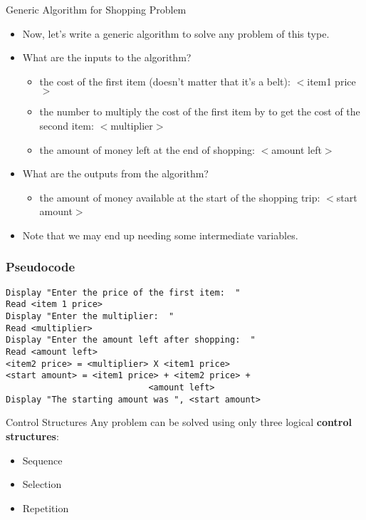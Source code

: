 \documentclass[graphics]{beamer}
\begin{document}
\begin{frame}{Generic Algorithm for Shopping Problem}
    \begin{itemize}
        \item Now, let’s write a generic algorithm to solve any problem of this type.
        \item What are the inputs to the algorithm?
        \begin{itemize}
            \item the cost of the first item (doesn’t matter that it’s a belt):  $<$item1 price$>$
            \item the number to multiply the cost of the first item by to get the cost of the second item:  $<$multiplier$>$
            \item the amount of money left at the end of shopping: $<$amount left$>$
        \end{itemize}
        \pause
        \item What are the outputs from the algorithm?
        \begin{itemize}
            \item the amount of money available at the start of the shopping trip: $<$start amount$>$
        \end{itemize}
        \item Note that we may end up needing some intermediate variables.
    \end{itemize}
\end{frame}

\begin{frame}[fragile]\frametitle{Pseudocode}
    \begin{verbatim}
Display "Enter the price of the first item:  "
Read <item 1 price>
Display "Enter the multiplier:  "
Read <multiplier>
Display "Enter the amount left after shopping:  "
Read <amount left>
<item2 price> = <multiplier> X <item1 price>
<start amount> = <item1 price> + <item2 price> +
                            <amount left>
Display "The starting amount was ", <start amount> 
    \end{verbatim}
\end{frame}

\begin{frame}{Control Structures}
    Any problem can be solved using only three logical \textbf{control structures}:
    \begin{itemize}
        \item Sequence
        \item Selection
        \item Repetition
    \end{itemize}
\end{frame}
\end{document}
